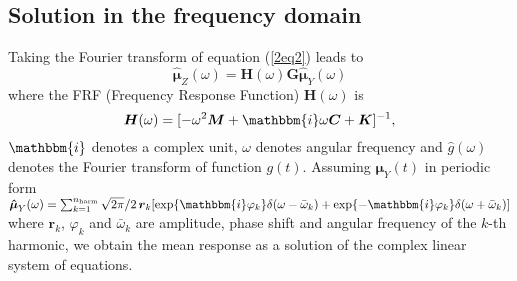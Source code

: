 \documentclass[preprint,12pt,authoryear]{elsarticle}
\newcommand{\bs}[1]{{\boldsymbol{#1}}}
\begin{document}
\subsection{Solution in the frequency domain}
\label{frequencydomain}
Taking the Fourier transform of equation (\ref{2eq2}) leads to
\begin{equation}
\bs{\hat{\mu}}_Z(\omega)=\bs{H}(\omega)\bs{G\hat{\mu}}_Y(\omega)
\label{2eq15}
\end{equation}
where the FRF (Frequency Response Function) $\bs{H}(\omega)$ is
\begin{equation}
\bs{H}(\omega)=[-\omega^2\bs{M}+\mathbbm{i}\omega\bs{C}+\bs{K}]^{-1},
\label{2eq16}
\end{equation}
$\mathbbm{i}$ denotes a complex unit, $\omega$ denotes angular frequency and $\hat{g}(\omega)$ denotes the Fourier transform of function $g(t)$. Assuming $\bs{\mu}_Y(t)$ in periodic form $\bs{\hat{\mu}}_Y(\omega)=\sum_{k=1}^{n_{\mathrm{harm}}}\sqrt{2\pi}/2\,\bs{r}_k[\exp\{\mathbbm{i}\varphi_k\}\delta(\omega-\bar{\omega}_k)+\exp\{-\mathbbm{i}\varphi_k\}\delta(\omega+\bar{\omega}_k)]$ where $\bs{r}_k$, $\varphi_k$ and $\bar{\omega}_k$ are amplitude, phase shift and angular frequency of the $k$-th harmonic, we obtain the mean response as a solution of the complex linear system of equations.
\end{document}
